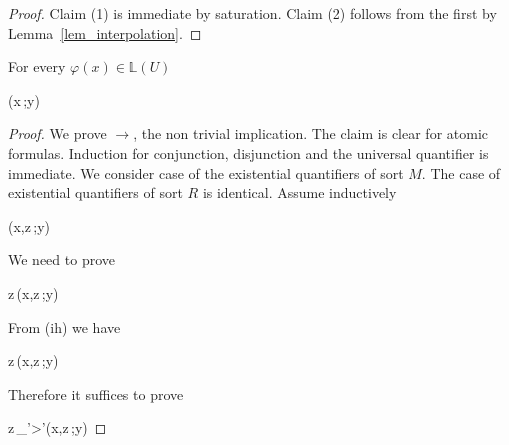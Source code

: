 \documentclass[11pt,oneside]{amsart}
\begin{document}
\begin{proof}
  Claim (1) is immediate by saturation.
  Claim (2) follows from the first by Lemma~\ref{lem_interpolation}.
\end{proof}

\begin{proposition}\label{prop_approx}
  For every $\varphi(x)\in\mathds{L}(U)$ 

  {\leftrightarrow}
  {\varphi(x\,;y)}

\end{proposition}

\begin{proof}
  We prove $\rightarrow$, the non trivial implication.
  The claim is clear for atomic formulas.
  Induction for conjunction, disjunction and the universal quantifier is immediate.
%
%
%
%
%
  We consider case of the existential quantifiers of sort $M$.
  The case of existential quantifiers of sort $R$ is identical.
  Assume inductively
  
  {\rightarrow}
  {\varphi(x,z\,;y)}

  We need to prove

  {\rightarrow}
  {\exists z\,\varphi(x,z\,;y)}

  From (ih) we have

  {\rightarrow}
  {\exists z\,\varphi(x,z\,;y)}

  Therefore it suffices to prove

  {\rightarrow}
  {\exists z\,\bigwedge_{\varphi'>\varphi}\varphi'(x,z\,;y)}


\end{proof}
\end{document}

